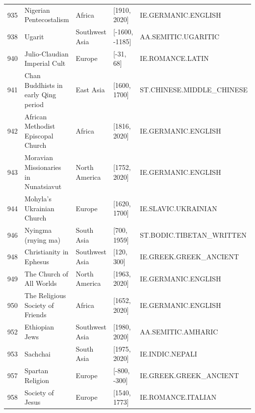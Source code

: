 {\begin{longtable}{rp{3.5cm}llp{3.5cm}}
935 & {\raggedright Nigerian Pentecostalism} & Africa & [1910, 2020] & {\raggedright IE.\allowbreak{}GERMANIC.\allowbreak{}ENGLISH} \\
938 & {\raggedright Ugarit} & Southwest Asia & [-1600, -1185] & {\raggedright AA.\allowbreak{}SEMITIC.\allowbreak{}UGARITIC} \\
940 & {\raggedright Julio-Claudian Imperial Cult} & Europe & [-31, 68] & {\raggedright IE.\allowbreak{}ROMANCE.\allowbreak{}LATIN} \\
941 & {\raggedright Chan Buddhists in early Qing period} & East Asia & [1600, 1700] & {\raggedright ST.\allowbreak{}CHINESE.\allowbreak{}MIDDLE\_\allowbreak{}CHINESE} \\
942 & {\raggedright African Methodist Episcopal Church} & Africa & [1816, 2020] & {\raggedright IE.\allowbreak{}GERMANIC.\allowbreak{}ENGLISH} \\
943 & {\raggedright Moravian Missionaries in Nunatsiavut} & North America & [1752, 2020] & {\raggedright IE.\allowbreak{}GERMANIC.\allowbreak{}ENGLISH} \\
944 & {\raggedright Mohyla's Ukrainian Church} & Europe & [1620, 1700] & {\raggedright IE.\allowbreak{}SLAVIC.\allowbreak{}UKRAINIAN} \\
946 & {\raggedright Nyingma (rnying ma)} & South Asia & [700, 1959] & {\raggedright ST.\allowbreak{}BODIC.\allowbreak{}TIBETAN\_\allowbreak{}WRITTEN} \\
948 & {\raggedright Christianity in Ephesus} & Southwest Asia & [120, 300] & {\raggedright IE.\allowbreak{}GREEK.\allowbreak{}GREEK\_\allowbreak{}ANCIENT} \\
949 & {\raggedright The Church of All Worlds} & North America & [1963, 2020] & {\raggedright IE.\allowbreak{}GERMANIC.\allowbreak{}ENGLISH} \\
950 & {\raggedright The Religious Society of Friends} & Africa & [1652, 2020] & {\raggedright IE.\allowbreak{}GERMANIC.\allowbreak{}ENGLISH} \\
952 & {\raggedright Ethiopian Jews} & Southwest Asia & [1980, 2020] & {\raggedright AA.\allowbreak{}SEMITIC.\allowbreak{}AMHARIC} \\
953 & {\raggedright Sachchai} & South Asia & [1975, 2020] & {\raggedright IE.\allowbreak{}INDIC.\allowbreak{}NEPALI} \\
957 & {\raggedright Spartan Religion} & Europe & [-800, -300] & {\raggedright IE.\allowbreak{}GREEK.\allowbreak{}GREEK\_\allowbreak{}ANCIENT} \\
958 & {\raggedright Society of Jesus} & Europe & [1540, 1773] & {\raggedright IE.\allowbreak{}ROMANCE.\allowbreak{}ITALIAN} \\

\end{longtable}}
